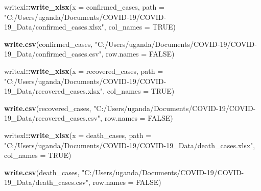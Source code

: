 \documentclass[
]{article}
\newenvironment{Shaded}{\begin{snugshade}}{\end{snugshade}}
\newcommand{\DataTypeTok}[1]{\textcolor[rgb]{0.13,0.29,0.53}{#1}}
\newcommand{\KeywordTok}[1]{\textcolor[rgb]{0.13,0.29,0.53}{\textbf{#1}}}
\newcommand{\NormalTok}[1]{#1}
\newcommand{\OperatorTok}[1]{\textcolor[rgb]{0.81,0.36,0.00}{\textbf{#1}}}
\newcommand{\OtherTok}[1]{\textcolor[rgb]{0.56,0.35,0.01}{#1}}
\newcommand{\StringTok}[1]{\textcolor[rgb]{0.31,0.60,0.02}{#1}}
\begin{document}
\begin{Shaded}
\begin{Highlighting}[]
\NormalTok{writexl}\OperatorTok{::}\KeywordTok{write_xlsx}\NormalTok{(}\DataTypeTok{x =}\NormalTok{ confirmed_cases, }\DataTypeTok{path =} \StringTok{"C:/Users/uganda/Documents/COVID-19/COVID-19_Data/confirmed_cases.xlsx"}\NormalTok{, }\DataTypeTok{col_names =} \OtherTok{TRUE}\NormalTok{)}

\KeywordTok{write.csv}\NormalTok{(confirmed_cases, }\StringTok{"C:/Users/uganda/Documents/COVID-19/COVID-19_Data/confirmed_cases.csv"}\NormalTok{, }\DataTypeTok{row.names =} \OtherTok{FALSE}\NormalTok{)}

\NormalTok{writexl}\OperatorTok{::}\KeywordTok{write_xlsx}\NormalTok{(}\DataTypeTok{x =}\NormalTok{ recovered_cases, }\DataTypeTok{path =} \StringTok{"C:/Users/uganda/Documents/COVID-19/COVID-19_Data/recovered_cases.xlsx"}\NormalTok{, }\DataTypeTok{col_names =} \OtherTok{TRUE}\NormalTok{)}

\KeywordTok{write.csv}\NormalTok{(recovered_cases, }\StringTok{"C:/Users/uganda/Documents/COVID-19/COVID-19_Data/recovered_cases.csv"}\NormalTok{, }\DataTypeTok{row.names =} \OtherTok{FALSE}\NormalTok{)}


\NormalTok{writexl}\OperatorTok{::}\KeywordTok{write_xlsx}\NormalTok{(}\DataTypeTok{x =}\NormalTok{ death_cases, }\DataTypeTok{path =} \StringTok{"C:/Users/uganda/Documents/COVID-19/COVID-19_Data/death_cases.xlsx"}\NormalTok{, }
                    \DataTypeTok{col_names =} \OtherTok{TRUE}\NormalTok{)}

\KeywordTok{write.csv}\NormalTok{(death_cases, }\StringTok{"C:/Users/uganda/Documents/COVID-19/COVID-19_Data/death_cases.csv"}\NormalTok{, }
          \DataTypeTok{row.names =} \OtherTok{FALSE}\NormalTok{)}
\end{Highlighting}
\end{Shaded}
\end{document}
